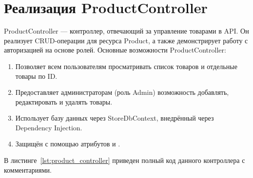 \documentclass[12pt]{article}
\renewcommand{\texttt}[1]{{\small\ttfamily #1}}
\numberwithin{listing}{section}
\numberwithin{figure}{section}
\begin{document}
\newpage

\section{Реализация ProductController}
\texttt{ProductController} — контроллер, отвечающий за управление товарами в API. Он реализует CRUD-операции для ресурса \texttt{Product}, а также демонстрирует работу с авторизацией на основе ролей.
Основные возможности \texttt{ProductController}:
\begin{enumerate}
	\item Позволяет всем пользователям просматривать список товаров и отдельные товары по ID.
	\item Предоставляет администраторам (роль Admin) возможность добавлять, редактировать и удалять товары.
	\item Использует базу данных через \texttt{StoreDbContext}, внедрённый через Dependency Injection.
	\item Защищён с помощью атрибутов \texttt{[Authorize]} и \texttt{[AllowAnonymous]}.
\end{enumerate}
В листинге~\ref{lst:product_controller} приведен полный код данного контроллера с комментариями.
\end{document}
